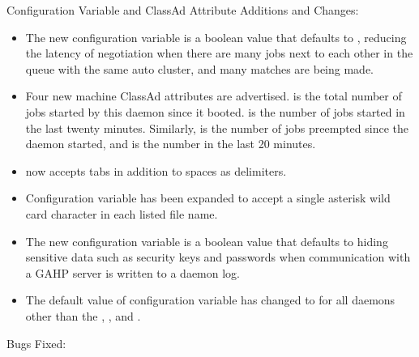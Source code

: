 \noindent Configuration Variable and ClassAd Attribute Additions and Changes:

\begin{itemize}

\item The new configuration variable 
is a boolean value that defaults to , 
reducing the latency of negotiation 
when there are many jobs next to each other in the queue 
with the same auto cluster, and many matches are being made.

\item Four new machine ClassAd attributes are advertised.
 is the total number of jobs started by 
this  daemon since it booted. 
 is the number of jobs started in the
last twenty minutes.  
Similarly,  is
the number of jobs preempted since the  daemon started,
and  is 
the number in the last 20 minutes.

\item {} now accepts tabs in addition to spaces as delimiters.

\item Configuration variable  has been expanded
to accept a single asterisk wild card character in each listed file name.

\item The new configuration variable 
is a boolean value that defaults to hiding sensitive data 
such as security keys and passwords
when communication with a GAHP server is written to a daemon log.

\item The default value of configuration variable 
 has changed to  for all
daemons other than the , , and .

\end{itemize}

\noindent Bugs Fixed:

